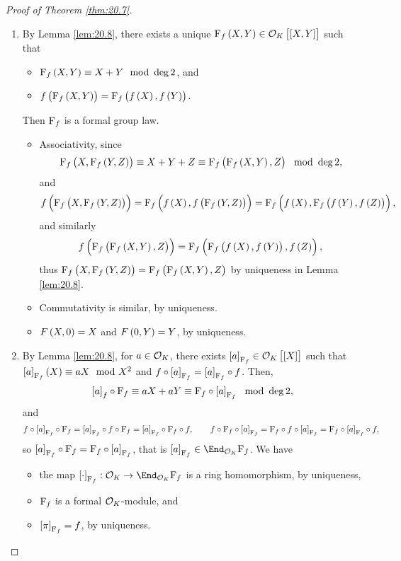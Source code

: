 
\begin{proof}[Proof of Theorem \ref{thm:20.7}]
\hfill
\begin{enumerate}
\item By Lemma \ref{lem:20.8}, there exists a unique $ \F_f\br{X, Y} \in \OOO_K\sbr{\sbr{X, Y}} $ such that
\begin{itemize}
\item $ \F_f\br{X, Y} \equiv X + Y \mod \deg 2 $, and
\item $ f\br{\F_f\br{X, Y}} = \F_f\br{f\br{X}, f\br{Y}} $.
\end{itemize}
Then $ \mathrm{F}_f $ is a formal group law.
\begin{itemize}
\item Associativity, since
$$ \F_f\br{X, \F_f\br{Y, Z}} \equiv X + Y + Z \equiv \F_f\br{\F_f\br{X, Y}, Z} \mod \deg 2, $$
and
$$ f\br{\F_f\br{X, \F_f\br{Y, Z}}} = \F_f\br{f\br{X}, f\br{\F_f\br{Y, Z}}} = \F_f\br{f\br{X}, \F_f\br{f\br{Y}, f\br{Z}}}, $$
and similarly
$$ f\br{\F_f\br{\F_f\br{X, Y}, Z}} = \F_f\br{\F_f\br{f\br{X}, f\br{Y}}, f\br{Z}}, $$
thus $ \F_f\br{X, \F_f\br{Y, Z}} = \F_f\br{\F_f\br{X, Y}, Z} $ by uniqueness in Lemma \ref{lem:20.8}.
\item Commutativity is similar, by uniqueness.
\item $ F\br{X, 0} = X $ and $ F\br{0, Y} = Y $, by uniqueness.
\end{itemize}
\item By Lemma \ref{lem:20.8}, for $ a \in \mathcal{O}_K $, there exists $ \sbr{a}_{\F_f} \in \OOO_K\sbr{\sbr{X}} $ such that $ \sbr{a}_{\F_f}\br{X} \equiv aX \mod X^2 $ and $ f \circ \sbr{a}_{\F_f} = \sbr{a}_{\F_f} \circ f $. Then,
$$ \sbr{a}_f \circ \F_f \equiv aX + aY \equiv \F_f \circ \sbr{a}_{\F_f} \mod \deg 2, $$
and
$$ f \circ \sbr{a}_{\F_f} \circ \F_f = \sbr{a}_{\F_f} \circ f \circ \F_f = \sbr{a}_{\F_f} \circ \F_f \circ f, \qquad f \circ \F_f \circ \sbr{a}_{\F_f} = \F_f \circ f \circ \sbr{a}_{\F_f} = \F_f \circ \sbr{a}_{\F_f} \circ f, $$
so $ \sbr{a}_{\F_f} \circ \F_f = \F_f \circ \sbr{a}_{\F_f} $, that is $ \sbr{a}_{\F_f} \in \End_{\OOO_K} \F_f $. We have
\begin{itemize}
\item the map $ \sbr{\cdot}_{\F_f} : \OOO_K \to \End_{\OOO_K} \F_f $ is a ring homomorphism, by uniqueness,
\item $ \mathrm{F}_f $ is a formal $ \mathcal{O}_K $-module, and
\item $ \sbr{\pi}_{\F_f} = f $, by uniqueness.
\end{itemize}

\end{enumerate}
\end{proof}
